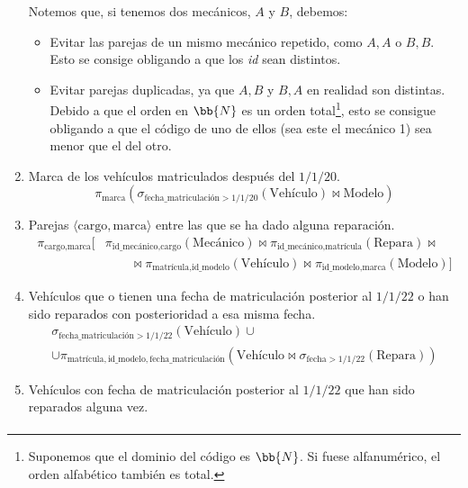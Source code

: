 \begin{ejercicio}
\begin{enumerate}
        Notemos que, si tenemos dos mecánicos, $A$ y $B$, debemos:
        \begin{itemize}
            \item Evitar las parejas de un mismo mecánico repetido, como $A,A$ o $B,B$. Esto se consige obligando a que los \emph{id} sean distintos.
            \item Evitar parejas duplicadas, ya que $A,B$ y $B,A$ en realidad son distintas. Debido a que el orden en $\bb{N}$ es un orden total\footnote{Suponemos que el dominio del código es $\bb{N}$. Si fuese alfanumérico, el orden alfabético también es total.}, esto se consigue obligando a que el código de uno de ellos (sea este el mecánico 1) sea menor que el del otro.
        \end{itemize}
        \item Marca de los vehículos matriculados después del $1/1/20$.
        \begin{equation*}
            \pi_{\text{marca}}(\sigma_{\text{fecha\_matriculación} > 1/1/20}(\text{Vehículo}) \bowtie \text{Modelo})
        \end{equation*}
        \item Parejas $\langle \text{cargo}, \text{marca} \rangle$ entre las que se ha dado alguna reparación.
        \begin{align*}
            \pi_{\text{cargo},\text{marca}}[&\pi_{\text{id\_mecánico},\text{cargo}}(\text{Mecánico})
            \bowtie \pi_{\text{id\_mecánico},\text{matrícula}}(\text{Repara})
            \bowtie\\&\qquad \bowtie \pi_{\text{matrícula},\text{id\_modelo}}(\text{Vehículo})
            \bowtie \pi_{\text{id\_modelo},\text{marca}}(\text{Modelo})]
        \end{align*}
        \item Vehículos que o tienen una fecha de matriculación posterior al $1/1/22$ o han sido reparados con posterioridad a esa misma fecha.
        \begin{multline*}
            \sigma_{\text{fecha\_matriculación} > 1/1/22}(\text{Vehículo}) \cup\\ \cup \pi_{\text{matrícula},\text{id\_modelo}, \text{fecha\_matriculación}}(\text{Vehículo}\bowtie \sigma_{\text{fecha}>1/1/22}(\text{Repara}))
        \end{multline*}
        \item Vehículos con fecha de matriculación posterior al $1/1/22$ que han sido reparados alguna vez.
        \begin{multline*}

\end{multline*}
\end{enumerate}
\end{ejercicio}
